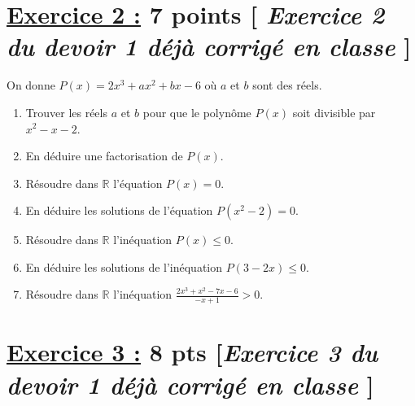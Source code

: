 \documentclass[12pt,a4paper]{article}
\begin{document}
\section*{\underline{Exercice 2 :} 7 points [\textit{ Exercice 2 du devoir 1 déjà corrigé en classe } ]}

On donne \( P(x) = 2x^3 + ax^2 + bx - 6 \) où \( a \) et \( b \) sont des réels.
\begin{enumerate}
    \item Trouver les réels \( a \) et \( b \) pour que le polynôme \( P(x) \) soit divisible par \( x^2 - x - 2 \).
    \item En déduire une factorisation de \( P(x) \).
    \item Résoudre dans \( \mathbb{R} \) l'équation \( P(x) = 0 \).
    \item En déduire les solutions de l'équation \( P(x^2 - 2) = 0 \).
    \item Résoudre dans \( \mathbb{R} \) l'inéquation \( P(x) \leq 0 \).
    \item En déduire les solutions de l'inéquation \( P(3 - 2x) \leq 0 \).
    \item Résoudre dans \( \mathbb{R} \) l'inéquation \( \frac{2x^3 + x^2 - 7x - 6}{-x + 1} > 0 \).
\end{enumerate}

\section*{\underline{Exercice 3 :} 8 pts 	[\textit{Exercice 3 du devoir 1 déjà corrigé en classe} ]}
\end{document}
